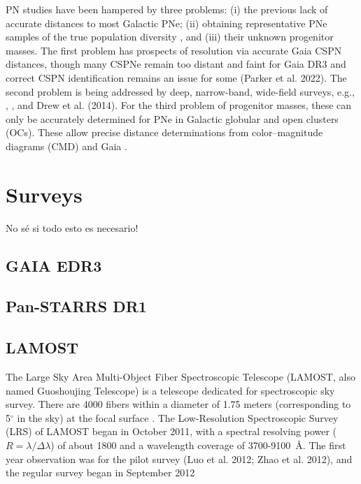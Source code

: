 \documentclass[twocolumn]{article}
\begin{document}
PN studies have been hampered by three problems:
(i) the previous lack of accurate distances to most Galactic
PNe; (ii) obtaining representative PNe samples of the true
population diversity \citep{Parker:2022}, and (iii) their unknown
progenitor masses. The first problem has prospects of
resolution via accurate Gaia CSPN distances, though many
CSPNe remain too distant and faint for Gaia DR3 and correct
CSPN identification remains an issue for some (Parker et al.
2022). The second problem is being addressed by deep, narrow-band,
wide-field surveys, e.g., \citet{Parker:2005},
\citet{Drew:2005}, and Drew et al. (2014). For the third problem
of progenitor masses, these can only
be accurately determined for PNe in Galactic globular and
open clusters (OCs). These allow precise distance determinations
from color–magnitude diagrams (CMD) and Gaia \citep{Fragkou:2022}.

\section{Surveys}
\label{sec:surveys}
{\sc No sé si todo esto es necesario!}

\subsection{GAIA EDR3}
\label{sec:gaia}

\subsection{Pan-STARRS DR1}
\label{sec:PS1}

\subsection{LAMOST}
\label{sec:lamost}

The Large Sky Area Multi-Object Fiber Spectroscopic Telescope
(LAMOST, also named Guoshoujing Telescope) is a
telescope dedicated for spectroscopic sky survey.
There are 4000 fibers within a diameter of 1.75 meters (corresponding
to 5$^{\circ}$ in the sky) at the focal surface \citep{Cui:2012}.
The Low-Resolution Spectroscopic Survey (LRS) of LAMOST
began in October 2011, with a spectral resolving power ($R = \lambda/\Delta\lambda$)
of about 1800 and a wavelength coverage of
3700-9100~\AA \citep{Zhao:2012}. The first year observation was
for the pilot survey (Luo et al. 2012; Zhao et al. 2012),
and the regular survey began in September 2012
\end{document}
